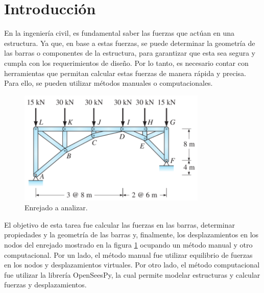 \documentclass{article}  %
\begin{document}
\newpage
\thispagestyle{empty} %

\newpage
\thispagestyle{empty} %
\tableofcontents
\thispagestyle{plain} %
\thispagestyle{empty} %

\thispagestyle{empty}
\listoffigures 
\thispagestyle{plain} %
\thispagestyle{empty}
\newpage
\setcounter{page}{1}
\section{Introducción}
En la ingeniería civil, es fundamental saber las fuerzas que actúan en una estructura. Ya que, en base a estas fuerzas, se puede determinar la geometría de las barras o componentes de la estructura, para garantizar que esta sea segura y cumpla con los requerimientos de diseño. Por lo tanto, es necesario contar con herramientas que permitan calcular estas fuerzas de manera rápida y precisa. Para ello, se pueden utilizar métodos manuales o computacionales.


\begin{figure}[h]
  \centering
  \includegraphics[width=0.8\textwidth]{imagenes/diagrama.png}
  \caption{Enrejado a analizar.}
  \label{fig:0}
\end{figure}

El objetivo de esta tarea fue calcular las fuerzas en las barras, determinar propiedades y la geometría de las barras y, finalmente, los desplazamientos en los nodos del enrejado mostrado en la figura \ref{fig:0} ocupando un método manual y otro computacional. Por un lado, el método manual fue utilizar equilibrio de fuerzas en los nodos y desplazamientos virtuales. Por otro lado, el método computacional fue utilizar la librería OpenSeesPy, la cual permite modelar estructuras y calcular fuerzas y desplazamientos. 
\end{document}
